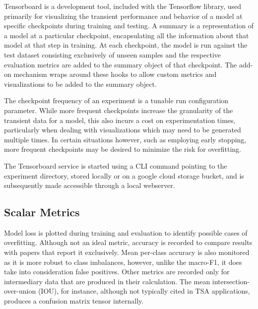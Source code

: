 \documentclass[../../fyp.tex]{subfiles}
\begin{document}
Tensorboard is a development tool, included with the Tensorflow library, used primarily for visualizing the transient performance and behavior of a model at specific checkpoints during training and testing. A summary is a representation of a model at a particular checkpoint, encapsulating all the information about that model at that step in training. At each checkpoint, the model is run against the test dataset consisting exclusively of unseen samples and the respective evaluation metrics are added to the summary object of that checkpoint. The add-on mechanism wraps around these hooks to allow custom metrics and visualizations to be added to the summary object.

 The checkpoint frequency of an experiment is a tunable run configuration parameter. While more frequent checkpoints increase the granularity of the transient data for a model, this also incurs a cost on experimentation times, particularly when dealing with visualizations which may need to be generated multiple times. In certain situations however, such as employing early stopping, more frequent checkpoints may be desired to minimize the risk for overfitting.

The Tensorboard service is started using a CLI command pointing to the experiment directory, stored locally or on a google cloud storage bucket, and is subsequently made accessible through a local webserver.   

\subsection{Scalar Metrics}
Model loss is plotted during training and evaluation to identify possible cases of overfitting. Although not an ideal metric, accuracy is recorded to compare results with papers that report it exclusively. Mean per-class accuracy is also monitored as it is more robust to class imbalances, however, unlike the macro-F1, it does take into consideration false positives. Other metrics are recorded only for intermediary data that are produced in their calculation. The mean intersection-over-union (IOU), for instance, although not typically cited in TSA applications, produces a confusion matrix tensor internally.
\end{document}
